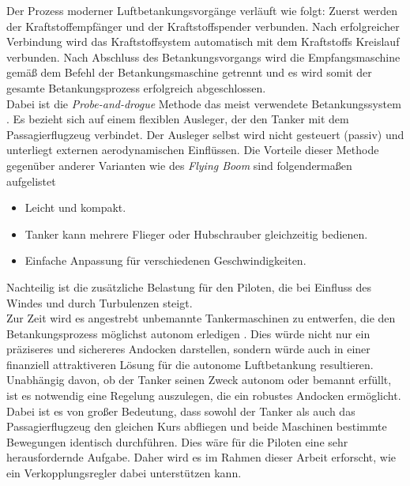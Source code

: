 Der Prozess moderner Luftbetankungsvorgänge verläuft wie folgt: Zuerst werden der Kraftstoffempfänger und der Kraftstoffspender verbunden. Nach erfolgreicher Verbindung wird das Kraftstoffsystem  automatisch mit dem Kraftstoffs Kreislauf verbunden. Nach Abschluss des Betankungsvorgangs wird die Empfangsmaschine gemäß dem Befehl der Betankungsmaschine getrennt und es wird somit der gesamte Betankungsprozess erfolgreich abgeschlossen.\\
Dabei ist die \textit{Probe-and-drogue} Methode das meist verwendete Betankungssystem \cite{Methoden}. Es bezieht sich auf einem flexiblen Ausleger, der den Tanker mit dem Passagierflugzeug verbindet. Der Ausleger selbst wird nicht gesteuert (passiv) und unterliegt externen aerodynamischen Einflüssen. Die Vorteile dieser Methode gegenüber anderer Varianten wie des \textit{Flying Boom} sind folgendermaßen aufgelistet \cite{Methoden}
\begin{itemize}
    \item Leicht und kompakt.
    \item Tanker kann mehrere Flieger oder Hubschrauber gleichzeitig bedienen.
    \item Einfache Anpassung für verschiedenen Geschwindigkeiten. 
\end{itemize}
Nachteilig ist die zusätzliche Belastung für den Piloten, die bei Einfluss des Windes und durch Turbulenzen steigt.\\ 
Zur Zeit wird es angestrebt unbemannte Tankermaschinen zu entwerfen, die den Betankungsprozess möglichst autonom erledigen \cite{Autonom1,Autonom2}. Dies würde nicht nur ein präziseres und sichereres Andocken darstellen, sondern würde auch in einer finanziell attraktiveren Lösung für die autonome Luftbetankung resultieren.\\
Unabhängig davon, ob der Tanker seinen Zweck autonom oder bemannt erfüllt, ist es notwendig eine Regelung auszulegen, die ein robustes Andocken ermöglicht. Dabei ist es von großer Bedeutung, dass sowohl der Tanker als auch das Passagierflugzeug den gleichen Kurs abfliegen und beide Maschinen bestimmte Bewegungen identisch durchführen. Dies wäre für die Piloten eine sehr herausfordernde Aufgabe. Daher wird es im Rahmen dieser Arbeit erforscht, wie ein Verkopplungsregler dabei unterstützen kann. 
